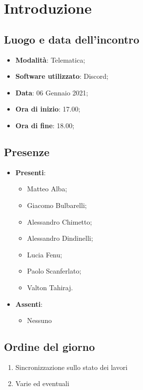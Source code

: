 \documentclass[]{article}
\begin{document}
	
	
	
	\newpage
	
	
		\section{Introduzione}
		\subsection{Luogo e data dell'incontro}
		\begin{itemize}
			\item \textbf{Modalità}: Telematica;
			\item \textbf{Software utilizzato}: Discord;
			\item \textbf{Data}: 06 Gennaio 2021;
			\item \textbf{Ora di inizio}: 17.00;
			\item \textbf{Ora di fine}: 18.00;
		\end{itemize}

		\subsection{Presenze}
		\begin{itemize}
			\item \textbf{Presenti}:
			\begin{itemize}
				\item Matteo Alba;
				\item Giacomo Bulbarelli;
				\item Alessandro Chimetto;
				\item Alessandro Dindinelli;
				\item Lucia Fenu;
				\item Paolo Scanferlato;
				\item Valton Tahiraj.
			\end{itemize}
			\item \textbf{Assenti}:
			\begin{itemize}
				\item Nessuno
			\end{itemize}
		\end{itemize}


		\subsection{Ordine del giorno}
		\begin{enumerate}
			\item Sincronizzazione sullo stato dei lavori
			\item Varie ed eventuali
		\end{enumerate}
\end{document}
